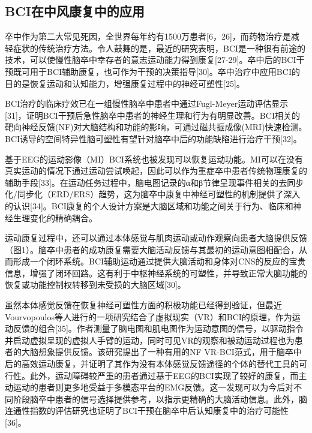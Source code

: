\documentclass[UTF8,a4paper]{ctexart}
\begin{document}
\subsection{BCI在中风康复中的应用}
卒中作为第二大常见死因，全世界每年约有1500万患者[6，26]，而药物治疗是减轻症状的传统治疗方法。令人鼓舞的是，最近的研究表明，BCI是一种很有前途的技术，可以使慢性脑卒中幸存者的意志运动能力得到康复[27-29]。卒中后的BCI干预既可用于BCI辅助康复，也可作为干预的决策指导[30]。卒中治疗中应用BCI的目的是恢复运动和认知能力，增强康复过程中的神经可塑性[25]。
\par
BCI治疗的临床疗效已在一组慢性脑卒中患者中通过Fugl-Meyer运动评估显示[31]，证明BCI干预后急性脑卒中患者的神经生理和行为有明显改善。BCI相关的靶向神经反馈(NF)对大脑结构和功能的影响，可通过磁共振成像(MRI)快速检测。BCI诱导的空间特异性脑可塑性有望针对脑卒中后的功能缺陷进行治疗干预[32]。
\par
基于EEG的运动影像（MI）BCI系统也被发现可以恢复运动功能。MI可以在没有真实运动的情况下通过运动尝试唤起，因此可以作为重症卒中患者传统物理康复的辅助手段[33]。在运动任务过程中，脑电图记录的α和β节律呈现事件相关的去同步化/同步化（ERD/ERS）趋势，这为脑卒中康复中神经可塑性的机制提供了深入的认识[34]。BCI康复的个人设计方案是大脑区域和功能之间关于行为、临床和神经生理变化的精确耦合。
\par
运动康复过程中，还可以通过本体感觉与肌肉运动或动作观察向患者大脑提供反馈（图1）。脑卒中患者的成功康复需要大脑活动反馈与其最初的运动意图相配合，从而形成一个闭环系统。BCI辅助运动通过提供大脑活动和身体对CNS的反应的宝贵信息，增强了闭环回路。这有利于中枢神经系统的可塑性，并导致正常大脑功能的恢复或功能控制权转移到未受损的大脑区域[30]。
\par
虽然本体感觉反馈在恢复神经可塑性方面的积极功能已经得到验证，但最近Vourvopoulos等人进行的一项研究结合了虚拟现实（VR）和BCI的原理，作为运动反馈的组合[35]。作者测量了脑电图和肌电图作为运动意图的信号，以驱动指令并启动虚拟呈现的虚拟人手臂的运动，同时可见VR的观察和被动运动过程也为患者的大脑想象提供反馈。该研究提出了一种有用的NF VR-BCI范式，用于脑卒中后的高效运动康复，并证明了其作为没有本体感觉反馈途径的个体的替代工具的可行性。此外，运动障碍较严重的患者通过基于EEG的BCI实现了较好的康复，而主动运动的患者则更多地受益于多模态平台的EMG反馈。这一发现可以为今后对不同阶段脑卒中患者的信号选择提供参考，以指示更精确的大脑活动信息。此外，脑连通性指数的评估研究也证明了BCI干预在脑卒中后认知康复中的治疗可能性[36]。
\end{document}
